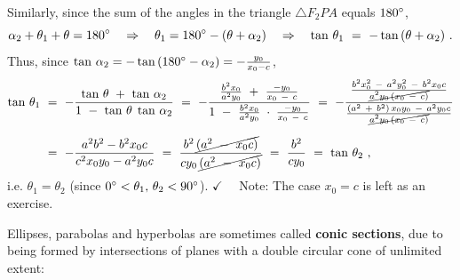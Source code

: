 Similarly, since the sum of the angles in the triangle
$\triangle F_2PA$ equals $180^\circ$,
\[
\alpha_2 + \theta_1 + \theta = 180^\circ \quad\Rightarrow\quad
\theta_1 = 180^\circ - (\theta + \alpha_2) \quad\Rightarrow\quad
\tan\,\theta_1 ~=~ -\tan\,(\theta + \alpha_2) ~.
\]
\newpage
\noindent Thus, since $\tan\,\alpha_2 = -\tan\,(180^\circ - \alpha_2) =
-\frac{y_0}{x_0-c}$,
\begin{align*}
\tan\,\theta_1 ~&=~ -\frac{\tan\,\theta ~+~ \tan\,\alpha_2}{1 ~-~ \tan\,\theta\;\tan\,\alpha_2} ~=~
 -\frac{\frac{b^2x_0}{a^2y_0} ~+~ \frac{-y_0}{x_0 ~-~ c}}{1 ~-~
 \frac{b^2x_0}{a^2y_0}\;\cdot\;\frac{-y_0}{x_0 ~-~ c}} ~=~
 -\frac{\frac{b^2 x_0^2 ~-~ a^2 y_0^2 ~-~ b^2 x_0 c}{\cancel{a^2 y_0\,(x_0 ~-~
  c)}}}{\frac{(a^2 ~+~ b^2)\,x_0 y_0 ~-~ a^2 y_0 c}{\cancel{a^2 y_0\,(x_0 ~-~ c)}}}\\[6pt]
&=~ -\frac{a^2 b^2 - b^2 x_0 c}{c^2 x_0 y_0 - a^2 y_0 c} ~=~
  \frac{b^2 \,\cancel{(a^2 ~-~ x_0 c)}}{cy_0\,\cancel{(a^2 ~-~ x_0 c)}} ~=~ \frac{b^2}{cy_0}
~=~ \tan\,\theta_2 ~,
\end{align*}
i.e. $\theta_1 = \theta_2$
(since $0^\circ < \theta_1,\,\theta_2 < 90^\circ$). $\checkmark\quad$
Note: The case $x_0=c$ is left as an exercise.\vspace{1mm}

\divider
\vspace{2mm}

Ellipses, parabolas and hyperbolas are sometimes called
\textbf{conic sections}, due to being formed by
intersections of planes with a double circular cone of unlimited extent:

